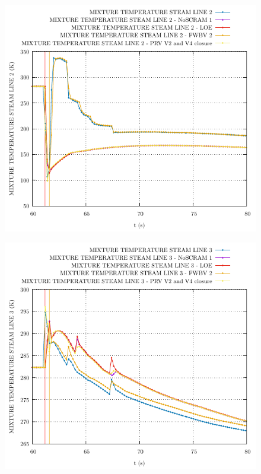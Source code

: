 \documentclass{article}
\begin{document}
\begin{multicols}{2}
\begin{figure}[H]
\centering
\includegraphics[width=\linewidth]{./graphs/MIXTURE TEMPERATURE STEAM LINE 2.pdf}
\end{figure}
\begin{figure}[H]
\centering
\includegraphics[width=\linewidth]{./graphs/MIXTURE TEMPERATURE STEAM LINE 3.pdf}
\end{figure}

\end{multicols}
\end{document}
